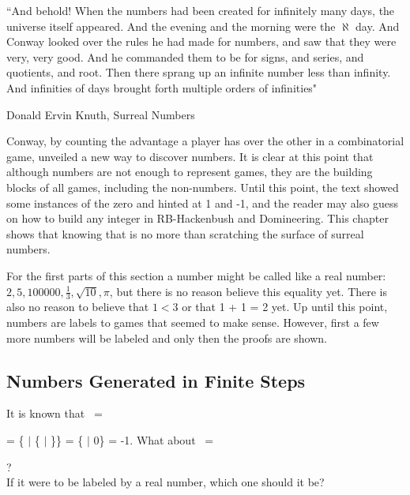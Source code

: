 \epigraph{``And behold! When the numbers had been created for infinitely many days, the universe itself appeared. And the evening and the morning were the $\aleph$ day. And Conway looked over the rules he had made for numbers, and saw that they were very, very good. And he commanded them to be for signs, and series, and quotients, and root. Then there sprang up an infinite number less than infinity. And infinities of days brought forth multiple orders of infinities"}{Donald Ervin Knuth, Surreal Numbers \footnotemark}



Conway, by counting the advantage a player has over the other in a combinatorial game, unveiled a new way to discover numbers. It is clear at this point that although numbers are not enough to represent games, they are the building blocks of all games, including the non-numbers. Until this point, the text showed some instances of the zero and hinted at 1 and -1, and the reader may also guess on how to build any integer in RB-Hackenbush and Domineering. This chapter shows that knowing that is no more than scratching the surface of surreal numbers.

For the first parts of this section a number  might be called like a real number: $2, 5, 100000, \frac{1}{3}, \sqrt{10}, \pi$, but there is no reason believe this equality yet. There is also no reason to believe that $1 < 3$ or that 1 + 1 = 2 yet. Up until this point, numbers are labels to games that seemed to make sense. However, first a few more numbers will be labeled and only then the proofs are shown.


\subsection*{Numbers Generated in Finite Steps}

It is known that \Gm\ =
 = \{ $|$ \{ $|$ \}\} = \{ $|$ 0\} = -1.
What about \Hm\ =  ?\\ If it were to be labeled by a real number, which one should it be?


